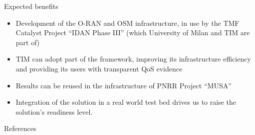 \documentclass[xcolor={usenames,dvipsnames,svgnames}]{beamer}
\begin{document}
\begin{frame}{Expected benefits}
	\begin{itemize}
		\setlength\itemsep{1em}
		\item Development of the O-RAN and OSM infrastructure, in use by the TMF Catalyst Project ``IDAN Phase III'' (which University of Milan and TIM are part of)
		\item TIM can adopt part of the framework, improving its infrastructure efficiency and providing its users with transparent \gls{QoS} evidence
		\item Results can be reused in the infrastructure of PNRR  Project ``MUSA''
		\item Integration of the solution in a real world test bed drives us to raise the solution's readiness level.
	\end{itemize}
\end{frame}

\begin{frame}[allowframebreaks]{References}{~}
	\nocite{
		anisetti2022security,
		anisetti2022assurance,
		anisetti2022orchestration,
		anisetti2022devsecops,
		berto20225g,
		anisetti2021security,
		berto2020spatial
	}
	\small
	
\end{frame}






\end{document}
